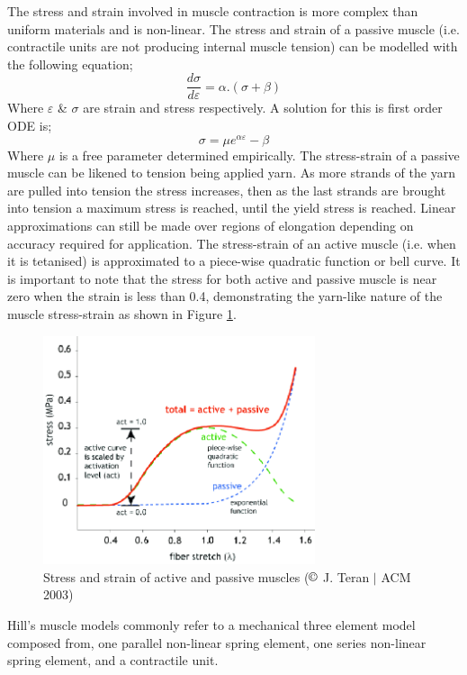 The stress and strain involved in muscle contraction is more complex than uniform materials and is non-linear. The stress and strain of a passive muscle (i.e. contractile units are not producing internal muscle tension) can be modelled with the following equation; 
\begin{equation}
    \frac{d\sigma}{d\varepsilon} =  \alpha.(\sigma+\beta)
\end{equation}
Where $\varepsilon$ \& $\sigma$ are strain and stress respectively. A solution for this is first order ODE is; 
\begin{equation}
    \sigma = \mu e^{\alpha\varepsilon} - \beta
\end{equation}
Where $\mu$ is a free parameter determined empirically. The stress-strain of a passive muscle can be likened to tension being applied yarn. As more strands of the yarn are pulled into tension the stress increases, then as the last strands are brought into tension a maximum stress is reached, until the yield stress is reached. Linear approximations can still be made over regions of elongation depending on accuracy required for application. The stress-strain of an active muscle (i.e. when it is tetanised) is approximated to a piece-wise quadratic function or bell curve. It is important to note that the stress for both active and passive muscle is near zero when the strain is less than 0.4, demonstrating the yarn-like nature of the muscle stress-strain as shown in Figure \ref{fig:muscle-fibre-stress}.
\begin{figure}[H]
  \centering
  \includegraphics[width=8cm]{Figures/Muscle-fiber-active-and-passive-behavior.png}
  \caption{Stress and strain of active and passive muscles ($\copyright$ J. Teran $|$ ACM 2003) \citep{Teran2003}}
  \label{fig:muscle-fibre-stress}
\end{figure}
Hill's muscle models commonly refer to a mechanical three element model \citep{Hill1938} composed from, one parallel non-linear spring element, one series non-linear spring element, and a contractile unit.
